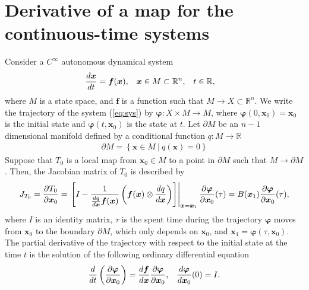 \documentclass[a4paper]{article}
\newcommand{\R}{\mathbb{R}}
\newcommand{\deriv}[3][1]{%
    \ifthenelse{\equal{#1}{1}}{\frac{d #2}{d #3}}{\frac{d^#1 #2}{{d #3}^#1}}
}
\newcommand{\pderiv}[3][1]{%
    \ifthenelse{\equal{#1}{1}}{\frac{\partial #2}{\partial #3}}{\frac{\partial^#1 #2}{{\partial #3}^#1}}
}
\newcommand{\jac}{J}
\newcommand{\parens}[1]{\left(#1\right)}
\newcommand{\braces}[1]{\left\{#1\right\}}
\newcommand{\set}[1]{\braces{#1}}
\newcommand{\parm}{\partial\!M}
\newcommand{\brackets}[1]{\left[#1\right]}
\newcommand{\traj}{\bm \varphi}
\begin{document}
\section{Derivative of a map for the continuous-time systems}
Consider a $C^{\infty}$ autonomous dynamical system
\begin{align}
    \begin{aligned}
        \deriv{\bm x}{t} &= \bm f(\bm x), &
        \bm x &\in M \subset \R^n, &
        t &\in \R,
    \end{aligned}
    \label{eq:sys}
\end{align}
where $M$ is a state space, and $\bm f$ is a function such that $M \to X \subset \R^n$.
We write the trajectory of the system (\ref{eq:sys}) by $\traj: X \times M \to M$,
where $\traj(0, \bm x_0) = \bm x_0$ is the initial state
and $\traj(t, \bm x_0)$ is the state at $t$.
Let $\parm$ be an $n-1$ dimensional manifold defined by
a conditional function $q: M \to \R$
\begin{align}
    \parm = \set{
        \bm x \in M ~|~
        q(\bm x) = 0
    }
\end{align}
Suppose that $T_0$ is a local map from $\bm x_0 \in M$ to a point in $\parm$
such that $M \to \parm$.
Then, the Jacobian matrix of $T_0$ is described by
\begin{align}
    \jac_{T_0} = \pderiv{T_0}{\bm x_0} =
    \left.
    \brackets{
        I -
        \frac{1}{\deriv{q}{\bm x} \bm f(\bm x)}
        \parens{\bm f(\bm x) \otimes \deriv{q}{\bm x}}
    }
    \right|_{\bm x = \bm x_1}
    \pderiv{\traj}{\bm x_0}(\tau)
    =
    B(\bm x_1) \pderiv{\traj}{\bm x_0}(\tau),
\end{align}
where $I$ is an identity matrix, $\tau$ is the spent time during the trajectory $\traj$
moves from $\bm x_0$ to the boundary $\parm$, which only depends on $\bm x_0$,
and $\bm x_1 = \traj(\tau, \bm x_0)$.
The partial derivative of the trajectory with respect to the initial state
at the time $t$ is the solution of the following ordinary differential equation
\begin{align}
    \begin{aligned}
        \deriv{}{t}
        \parens{\pderiv{\traj}{\bm x_0}}
        &= \deriv{\bm f}{\bm x} \pderiv{\traj}{\bm x_0},
        & \deriv{\traj}{\bm x_0}(0) = I.
    \end{aligned}
\end{align}
\end{document}
